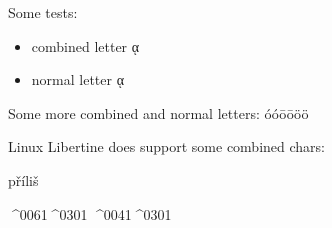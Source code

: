 \documentclass{article}
\begin{document}
Some tests:
\begin{itemize}
  \item combined letter ᾳ %
  \item normal letter ᾳ%
\end{itemize}

Some more combined and normal letters: 
óóōōöö

Linux Libertine does support some combined chars: \parbox{4em}{příliš}

^^^^0061^^^^0301 ^^^^0041^^^^0301
\end{document}
